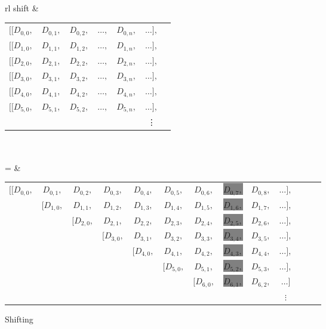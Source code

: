\begin{figure}
  \small
  \centering
  \begin{tabular}{rl}
    shift &
    \begin{tabular}{ccccccc}
      $[[D_{0,0},$ & $D_{0,1},$ & $D_{0,2},$ & $\ldots,$ & $D_{0,n},$ & $\ldots],$ \\
      $[[D_{1,0},$ & $D_{1,1},$ & $D_{1,2},$ & $\ldots,$ & $D_{1,n},$ & $\ldots],$ \\
      $[[D_{2,0},$ & $D_{2,1},$ & $D_{2,2},$ & $\ldots,$ & $D_{2,n},$ & $\ldots],$ \\
      $[[D_{3,0},$ & $D_{3,1},$ & $D_{3,2},$ & $\ldots,$ & $D_{3,n},$ & $\ldots],$ \\
      $[[D_{4,0},$ & $D_{4,1},$ & $D_{4,2},$ & $\ldots,$ & $D_{4,n},$ & $\ldots],$ \\
      $[[D_{5,0},$ & $D_{5,1},$ & $D_{5,2},$ & $\ldots,$ & $D_{5,n},$ & $\ldots],$ \\
      & & & & & \vdots
    \end{tabular}\\\\
    = &
    \begin{tabular}{ccccccccccccc}
      $[[D_{0,0},$ & $D_{0,1},$ & $D_{0,2},$ & $D_{0,3},$ & $D_{0,4},$ & $D_{0,5},$ & $D_{0,6},$ & \colorbox{gray}{$D_{0,7},$} & $D_{0,8},$ & $\ldots],$\\
      & $[D_{1,0},$ & $D_{1,1},$ & $D_{1,2},$ & $D_{1,3},$ & $D_{1,4},$ & $D_{1,5},$ & \colorbox{gray}{$D_{1,6},$} & $D_{1,7},$ &  $\ldots],$\\
      && $[D_{2,0},$ & $D_{2,1},$ & $D_{2,2},$ & $D_{2,3},$ & $D_{2,4},$ & \colorbox{gray}{$D_{2,5},$} & $D_{2,6},$ & $\ldots],$\\
      &&& $[D_{3,0},$ & $D_{3,1},$ & $D_{3,2},$ & $D_{3,3},$ & \colorbox{gray}{$D_{3,4},$} & $D_{3,5},$ & $\ldots],$\\
      &&&& $[D_{4,0},$ & $D_{4,1},$ & $D_{4,2},$ & \colorbox{gray}{$D_{4,3},$} & $D_{4,4},$ & $\ldots],$\\
      &&&&& $[D_{5,0},$ & $D_{5,1},$ & \colorbox{gray}{$D_{5,2},$} & $D_{5,3},$ & $\ldots],$\\
      &&&&&& $[D_{6,0},$ & \colorbox{gray}{$D_{6,1},$} & $D_{6,2},$ & $\ldots]$\\
      &&&&&&&         &        & $\vdots$ &           &        &           
    \end{tabular}
  \end{tabular}
  \caption{Shifting}
  \label{fig:ShiftGen}
\end{figure}


